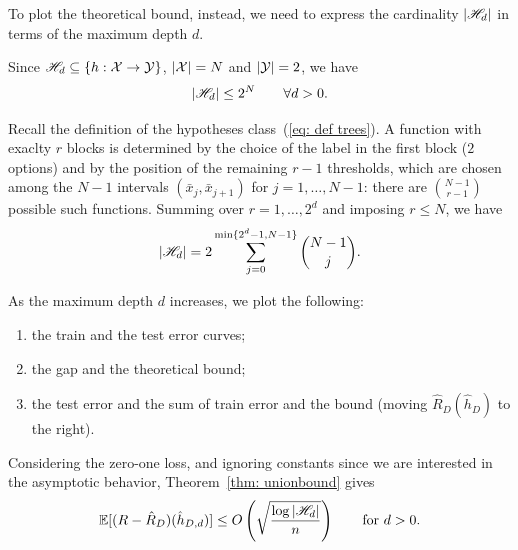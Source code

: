 \documentclass[reqno]{amsart}
\begin{document}
To plot the theoretical bound, instead, we need to express the cardinality $\vert \mathscr{H}_d\vert$ in terms of the maximum depth $d$. 
\begin{fact}\label{fact: upp b card}
Since $\mathscr{H}_d \subseteq \{h:\mathcal{X} \to \mathcal{Y}\}$, $\vert \mathcal{X}\vert = N$ and $\vert \mathcal{Y} \vert = 2$, we have 
\[
\vert \mathscr{H}_d\vert \le 2^N \qquad \forall d>0.
\]
\end{fact}
Recall the definition of the hypotheses class~(\ref{eq: def trees}). A function with exaclty $r$ blocks is determined by the choice of the label in the first block ($2$ options) and by the position of the remaining $r-1$ thresholds, which are chosen among the $N-1$ intervals $(\bar x_j, \bar x_{j+1})$ for $j =1,\ldots, N-1$: there are $\binom{N-1}{r-1}$ possible such functions. Summing over $r = 1,\ldots, 2^d$ and imposing $r\le N$, we have
\[
\vert \mathscr{H}_d\vert = 2 \sum_{j = 0}^{\min\{2^d -1, N-1\}}\binom{N-1}{j}.
\]



As the maximum depth $d$ increases, we plot the following:
\begin{enumerate}
    \item[1.] the train and the test error curves;
    \item[2.] the gap and the theoretical bound;
    \item[3.] the test error and the sum of train error and the bound (moving $\hat R_D(\hat h_D)$ to the right).
\end{enumerate}

Considering the zero-one loss, and ignoring constants since we are interested in the asymptotic behavior, Theorem~\ref{thm: unionbound} gives
\begin{equation}\label{eq: union bound}
\mathbb{E}[(R - \hat R_D)(\hat h_{D,d})] \le O\left(\sqrt{\frac{\log \vert \mathscr{H}_d \vert}{n}}\right) \qquad \text{for }d>0.
\end{equation}

\end{document}
